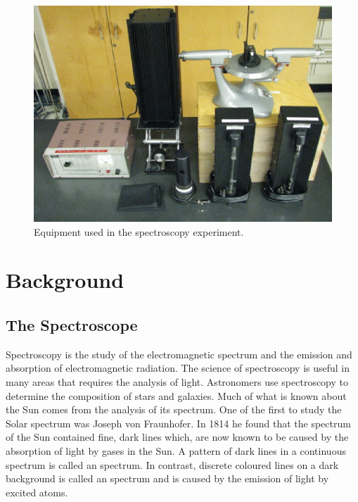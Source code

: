 \documentclass[12pt, a4paper, oneside, openright, titlepage]{book}
\begin{document}
\begin{figure}[H]
    \centering
    \includegraphics[scale = 0.8]{Images/SPEC1.PNG}
    \caption{Equipment used in the spectroscopy experiment.}
    \label{fig:SPEC1}
\end{figure}


\section{Background}

\subsection{The Spectroscope}

Spectroscopy is the study of the electromagnetic spectrum and the emission and absorption of electromagnetic radiation. The science of spectroscopy is useful in many areas that requires the analysis of light. Astronomers use spectroscopy to determine the composition of stars and galaxies. Much of what is known about the Sun comes from the analysis of its spectrum. One of the first to study the Solar spectrum was Joseph von Fraunhofer. In 1814 he found that the spectrum of the Sun contained fine, dark lines which, are now known to be caused by the absorption of light by gases in the Sun. A pattern of dark lines in a continuous spectrum is called an  spectrum. In contrast, discrete coloured lines on a dark background is called an  spectrum and is caused by the emission of light by excited atoms.
\end{document}
